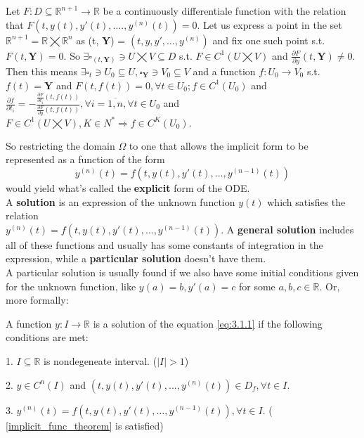 \begin{theorem}
    Let $F:D \subseteq \mathbb{R}^{n+1}\rightarrow\mathbb{R}$ be a continuously differentiale function with the relation that $F(t,y(t),y'(t),....,y^{(n)}(t))=0$. Let us express a point in the set $\mathbb{R}^{n+1} =\mathbb{R}\bigtimes\mathbb{R}^n$ as (t, \textbf{Y}) = $(t, y,y', \dots, y^{ (n) })$ and fix one such point s.t. $F(t, \textbf{Y})=0$.
    So $\exists \square_{(t, \textbf{Y})} \ni U \bigtimes V \subseteq D$ s.t. $F \in C^1(U\bigtimes V)$ and $\frac{\partial F}{\partial y}(t, \textbf{Y}) \neq 0.$ Then this means $ \exists \square_{t} \ni U_0 \subseteq U,
        \square_{\textbf{Y}} \ni V_0 \subseteq V$ and a function $f : U_0 \rightarrow V_0$ s.t. $f(t) = \textbf{Y}$ and $F(t,f(t))=0, \forall t \in U_0; f \in C^1(U_0)$ and $\frac{\partial f}{\partial t_i} = - \frac{\frac{\partial F}{\partial t_i}(t,f(t))}{\frac{\partial F}{\partial y}(t,f(t))}, \forall i = \overline{1,n} , \forall t \in U_0$ and $F \in C^1(U \bigtimes V),K \in N^* \Rightarrow f \in C^K(U_0).$
\end{theorem}

So restricting the domain $\Omega$ to one that allows the implicit form to be represented as a function of the form
\begin{equation}\label{implicit_func_theorem}
    y^{(n)}(t)=f(t,y(t),y'(t),...,y^{(n-1)}(t))
\end{equation}
would yield what's called the \textbf{explicit} form of the ODE. \\

A \textbf{solution} is an expression of the unknown function $y(t)$ which satisfies the relation \\
$y^{(n)}(t) = f(t,y(t),y'(t),\dots,y^{(n-1)}(t))$. A \textbf{general solution} includes all of these functions and usually has some constants of integration in the expression, while a \textbf{particular solution} doesn't have them. \\
A particular solution is usually found if we also have some initial conditions given for the unknown function, like $y(a)=b, y'(a)=c$ for some $a,b,c  \in \mathbb{R}$.
Or, more formally:

\begin{definition}
    A function $y:I \rightarrow \mathbb{R}$ is a solution of the equation \ref{eq:3.1.1} if the following conditions are met:

    1. $I \subseteq \mathbb{R}$ is nondegeneate interval. ($|I|>1$)

    2. $y \in C^n(I)$ and $(t,y(t), y'(t), \dots, y^{(n)}(t)) \in D_f, \forall t \in I$.

    3. $y^{(n)}(t)= f(t,y(t),y'(t),\dots,y^{ (n-1) }(t)), \forall t \in I$. ( \ref{implicit_func_theorem} is satisfied)

\end{definition}

